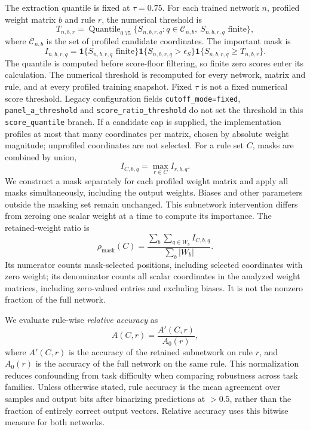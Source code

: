 \documentclass{article}
\begin{document}
The extraction quantile is fixed at $\tau=0.75$. For each trained network $n$, profiled weight matrix $b$ and rule $r$, the numerical threshold is
\begin{equation}
T_{n,b,r}=\operatorname{Quantile}_{0.75}\{S_{n,b,r,q}:q\in\mathcal C_{n,b},\ S_{n,b,r,q}\text{ finite}\},
\end{equation}
where $\mathcal C_{n,b}$ is the set of profiled candidate coordinates. The important mask is
\begin{equation}
I_{n,b,r,q}=\mathbf{1}\{S_{n,b,r,q}\text{ finite}\}\mathbf{1}\{S_{n,b,r,q}>\epsilon_S\}\mathbf{1}\{S_{n,b,r,q}\ge T_{n,b,r}\}.
\label{eq:important_mask}
\end{equation}
The quantile is computed before score-floor filtering, so finite zero scores enter its calculation. The numerical threshold is recomputed for every network, matrix and rule, and at every profiled training snapshot. Fixed $\tau$ is not a fixed numerical score threshold. Legacy configuration fields \texttt{cutoff\_mode=fixed}, \texttt{panel\_a\_threshold} and \texttt{score\_ratio\_threshold} do not set the threshold in this \texttt{score\_quantile} branch. If a candidate cap is supplied, the implementation profiles at most that many coordinates per matrix, chosen by absolute weight magnitude; unprofiled coordinates are not selected. For a rule set $C$, masks are combined by union,
\begin{equation}
I_{C,b,q}=\max_{r\in C}I_{r,b,q}.
\end{equation}
We construct a mask separately for each profiled weight matrix and apply all masks simultaneously, including the output weights. Biases and other parameters outside the masking set remain unchanged. This subnetwork intervention differs from zeroing one scalar weight at a time to compute its importance. The retained-weight ratio is
\begin{equation}
\rho_{\mathrm{mask}}(C)=\frac{\sum_b\sum_{q\in W_b}I_{C,b,q}}{\sum_b|W_b|}.
\label{eq:retained_mask_ratio}
\end{equation}
Its numerator counts mask-selected positions, including selected coordinates with zero weight; its denominator counts all scalar coordinates in the analyzed weight matrices, including zero-valued entries and excluding biases. It is not the nonzero fraction of the full network.

We evaluate rule-wise \emph{relative accuracy} as
\begin{equation}
A(C,r) = \frac{A'(C,r)}{A_0(r)},
\label{eq:eq3}
\end{equation}
where $A'(C,r)$ is the accuracy of the retained subnetwork on rule $r$, and $A_0(r)$ is the accuracy of the full network on the same rule. This normalization reduces confounding from task difficulty when comparing robustness across task families. Unless otherwise stated, rule accuracy is the mean agreement over samples and output bits after binarizing predictions at $>0.5$, rather than the fraction of entirely correct output vectors. Relative accuracy uses this bitwise measure for both networks.
\end{document}
